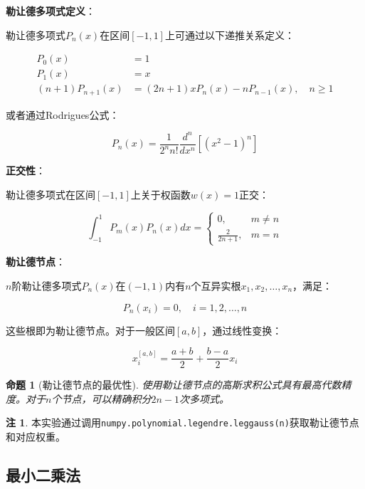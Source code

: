 \documentclass[a4paper,12pt]{article}
\newtheorem{proposition}[theorem]{命题}
\theoremstyle{definition}
\newtheorem{remark}{注}[section]
\begin{document}
\textbf{勒让德多项式定义}：

勒让德多项式$P_n(x)$在区间$[-1, 1]$上可通过以下递推关系定义：

\begin{align}
P_0(x) &= 1 \\
P_1(x) &= x \\
(n+1)P_{n+1}(x) &= (2n+1)xP_n(x) - nP_{n-1}(x), \quad n \geq 1
\end{align}

或者通过Rodrigues公式：

\begin{equation}
P_n(x) = \frac{1}{2^n n!}\frac{d^n}{dx^n}[(x^2-1)^n]
\end{equation}

\textbf{正交性}：

勒让德多项式在区间$[-1, 1]$上关于权函数$w(x) = 1$正交：

\begin{equation}
\int_{-1}^{1} P_m(x)P_n(x)dx = 
\begin{cases}
0, & m \neq n \\
\frac{2}{2n+1}, & m = n
\end{cases}
\end{equation}

\textbf{勒让德节点}：

$n$阶勒让德多项式$P_n(x)$在$(-1, 1)$内有$n$个互异实根$x_1, x_2, \ldots, x_n$，满足：

\begin{equation}
P_n(x_i) = 0, \quad i = 1, 2, \ldots, n
\end{equation}

这些根即为勒让德节点。对于一般区间$[a, b]$，通过线性变换：

\begin{equation}
x_i^{[a,b]} = \frac{a + b}{2} + \frac{b - a}{2}x_i
\end{equation}

\begin{proposition}[勒让德节点的最优性]
使用勒让德节点的高斯求积公式具有最高代数精度。对于$n$个节点，可以精确积分$2n-1$次多项式。
\end{proposition}

\begin{remark}
本实验通过调用\texttt{numpy.polynomial.legendre.leggauss(n)}获取勒让德节点和对应权重。
\end{remark}

\subsection{最小二乘法}
\end{document}
